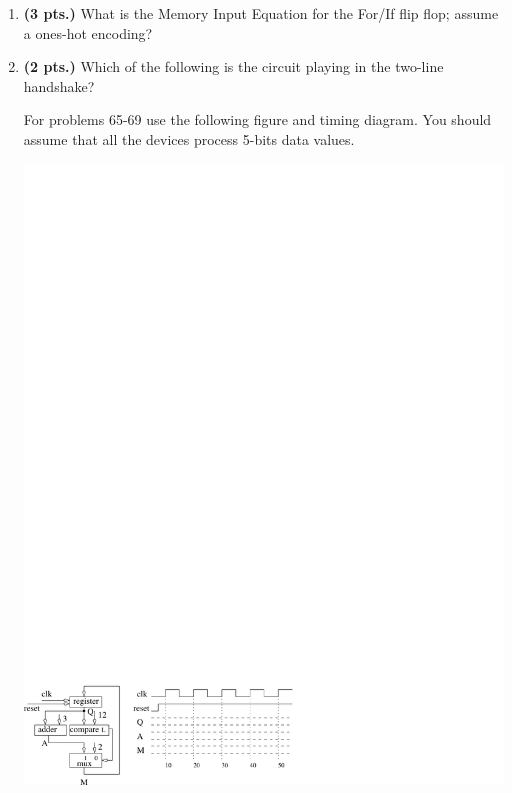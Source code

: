 \documentclass{article}
\begin{document}
\begin{enumerate}
\item{\bf (3 pts.)} What is the Memory Input Equation for the For/If
flip flop; assume a ones-hot encoding?

\item{\bf (2 pts.)} Which of the following is the circuit playing in the
two-line handshake?


\pagebreak
For problems 65-69 use the following figure and timing diagram.
You should assume that all the devices process 5-bits data
values.

\includegraphics{./Fig3/BBBtiming1}


\end{enumerate}
\end{document}
